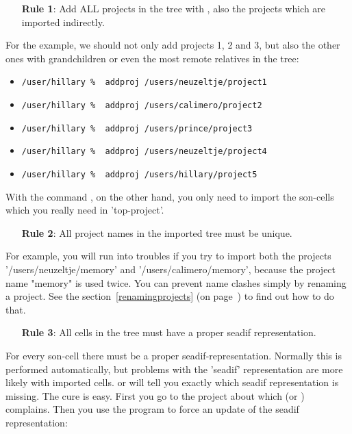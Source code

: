 \begin{itemize}
\item[{\bf Rule 1}:]
Add ALL projects in the tree with , also the projects which are imported
indirectly.
\end{itemize}

For the example, we should not only add projects 1, 2 and 3, but also
the other ones with grandchildren or even the most remote relatives in
the tree:
\begin{itemize}%
\item
{\tt /user/hillary\thedir~\%~ addproj /users/neuzeltje/project1}%
\item
{\tt /user/hillary\thedir~\%~ addproj /users/calimero/project2}%
\item
{\tt /user/hillary\thedir~\%~ addproj /users/prince/project3}%
\item
{\tt /user/hillary\thedir~\%~ addproj /users/neuzeltje/project4}%
\item
{\tt /user/hillary\thedir~\%~ addproj /users/hillary/project5}%
\end{itemize}

With the command , on the other hand, you only need to import
the son-cells which you really need in 'top-project'.

\begin{itemize}
\item[{\bf Rule 2}:]
All project names in the imported tree must be unique. 
\end{itemize}

For example, you will run into troubles if you try to import both the
projects '/users/neuzeltje/memory' and '/users/calimero/memory',
because the project name "memory" is used twice. You can prevent name
clashes simply by renaming a project. See the section~\ref{renamingprojects}
(on page~\pageref{renamingprojects}) to find out how to do that.

\begin{itemize}
\item[{\bf Rule 3}:]
All cells in the tree must have a proper seadif representation. 
\end{itemize}

For every son-cell there must be a proper seadif-representation. Normally this is
performed automatically, but problems with the 'seadif' representation are more
likely with imported cells.
 or  will tell you exactly which seadif
representation is missing.  The cure is easy. First you go to the project about
which  (or ) complains. Then you use the program
 to force an update of the seadif representation:

